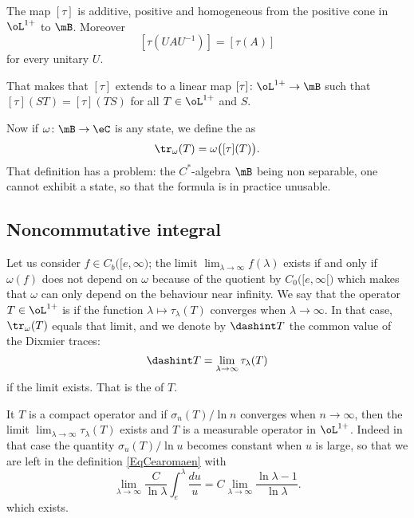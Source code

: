 \begin{proposition}
The map $[\tau]$ is additive, positive and homogeneous from the positive cone in $\oL^{1+}$ to $\mB$. Moreover
\[
  [\tau(UAU^{-1})]=[\tau(A)]
\]
for every unitary $U$.
\end{proposition}
That makes that $[\tau]$ extends to a linear map $[\tau]\colon \oL^{1+}\to \mB$ such that $[\tau](ST)=[\tau](TS)$ for all $T\in\oL^{1+}$ and $S$.

Now if $\omega\colon \mB\to \eC$ is any state, we define the  as
\begin{equation}
\tr_{\omega}(T)=\omega\big( [\tau](T) \big).
\end{equation}
That definition has a problem: the $C^*$-algebra $\mB$ being non separable, one cannot exhibit a state, so that the formula is in practice unusable.

\subsection{Noncommutative integral}

Let us consider $f\in C_b\big( [e,\infty \big)$; the limit $\lim_{\lambda\to\infty}f(\lambda)$ exists if and only if $\omega(f)$ does not depend on $\omega$ because of the quotient by $C_0\big( [e,\infty[ \big)$ which makes that $\omega$ can only depend on the behaviour near infinity. We say that the operator $T\in\oL^{1+}$ is  if the function $\lambda\mapsto\tau_{\lambda}(T)$ converges when $\lambda\to\infty$. In that case, $\tr_{\omega}(T)$ equals that limit, and we denote by $\dashint T$ the common value of the Dixmier traces:
\begin{equation}
\dashint T=\lim_{\lambda\to\infty}\tau_{\lambda}(T)
\end{equation}
if the limit exists. That is the  of $T$.

It $T$ is a compact operator and if $\sigma_n(T)/\ln n$ converges when $n\to\infty$, then the limit $\lim_{\lambda\to\infty}\tau_{\lambda}(T)$ exists and $T$ is a measurable operator in $\oL^{1+}$. Indeed in that case the quantity $\sigma_u(T)/\ln u$ becomes constant when $u$ is large, so that we are left in the definition \eqref{EqCearomaen} with
\[
  \lim_{\lambda\to\infty}\frac{C}{ \ln\lambda }\int_e^{\lambda}\frac{ du }{ u }=C\lim_{\lambda\to\infty}\frac{ \ln\lambda-1 }{ \ln\lambda }.
\]
which exists.

